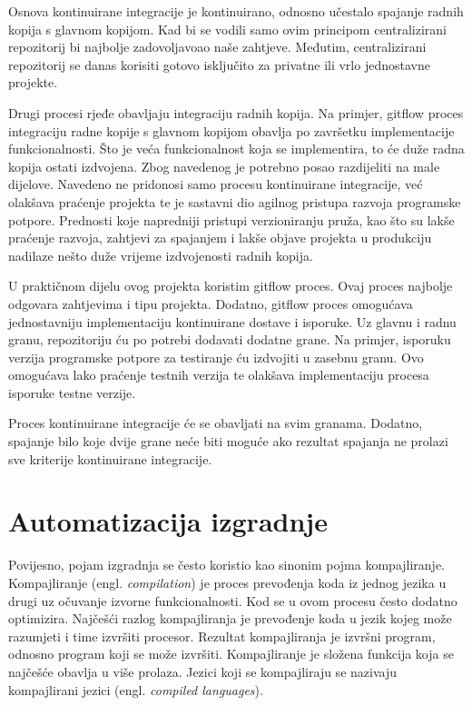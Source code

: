 \documentclass[times, utf8, diplomski, numeric]{fer}
\newcommand{\eng}[1]{(engl. \textit{#1})}
\begin{document}
Osnova kontinuirane integracije je kontinuirano, odnosno učestalo spajanje radnih kopija s glavnom kopijom. Kad bi se vodili samo ovim principom centralizirani repozitorij bi najbolje zadovoljavoao naše zahtjeve. Međutim, centralizirani repozitorij se danas korisiti gotovo isključito za privatne ili vrlo jednostavne projekte.

Drugi procesi rjeđe obavljaju integraciju radnih kopija. Na primjer, gitflow proces integraciju radne kopije s glavnom kopijom obavlja po završetku implementacije funkcionalnosti. Što je veća funkcionalnost koja se implementira, to će duže radna kopija ostati izdvojena. Zbog navedenog je potrebno posao razdijeliti na male dijelove. Navedeno ne pridonosi samo procesu kontinuirane integracije, već olakšava praćenje projekta te je sastavni dio agilnog pristupa razvoja programske potpore. Prednosti koje napredniji pristupi verzioniranju pruža, kao što su lakše praćenje razvoja, zahtjevi za spajanjem i lakše objave projekta u produkciju nadilaze nešto duže vrijeme izdvojenosti radnih kopija.

U praktičnom dijelu ovog projekta koristim gitflow proces. Ovaj proces najbolje odgovara zahtjevima i tipu projekta. Dodatno, gitflow proces omogućava jednostavniju implementaciju kontinuirane dostave i isporuke. Uz glavnu i radnu granu, repozitoriju ću po potrebi dodavati dodatne grane. Na primjer, isporuku verzija programske potpore za testiranje ću izdvojiti u zasebnu granu. Ovo omogućava lako praćenje testnih verzija te olakšava implementaciju procesa isporuke testne verzije.

Proces kontinuirane integracije će se obavljati na svim granama. Dodatno, spajanje bilo koje dvije grane neće biti moguće ako rezultat spajanja ne prolazi sve kriterije kontinuirane integracije.


\section{Automatizacija izgradnje}

Povijesno, pojam izgradnja se često koristio kao sinonim pojma kompajliranje. Kompajliranje \eng{compilation} je proces prevođenja koda iz jednog jezika u drugi uz očuvanje izvorne funkcionalnosti. Kod se u ovom procesu često dodatno optimizira. Najčešći razlog kompajliranja je prevođenje koda u jezik kojeg može razumjeti i time izvršiti procesor. Rezultat kompajliranja je izvršni program, odnosno program koji se može izvršiti. Kompajliranje je složena funkcija koja se najčešće obavlja u više prolaza. Jezici koji se kompajliraju se nazivaju kompajlirani jezici \eng{compiled languages}.
\end{document}
